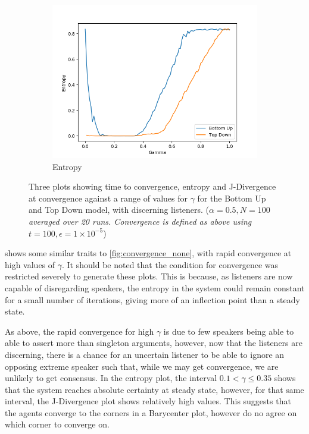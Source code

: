 \begin{figure}[H]
\begin{subfigure}[ht]{0.45\textwidth}
    \includegraphics[width=\textwidth]{Images/Figures/All/Entropy_FIE_n_3_p_100_alpha_0,3_30_runs.png}
    \caption{Entropy}
 \end{subfigure}

 \caption{Three plots showing time to convergence, entropy and J-Divergence at convergence against a range of values for $\gamma$ for the Bottom Up and Top Down model, with discerning listeners. (\textit{$\alpha = 0.5, N = 100$ averaged over 20 runs. Convergence is defined as above using $t=100, \epsilon = 1\times10^{-5}$})}\label{fig:convergence_FIE}
\end{figure}


 shows some similar traits to \cref{fig:convergence_none}, with rapid convergence at high values of $\gamma$. It should be noted that the condition for convergence was restricted severely to generate these plots. This is because, as listeners are now capable of disregarding speakers, the entropy in the system could remain constant for a small number of iterations, giving more of an inflection point than a steady state. 

As above, the rapid convergence for high $\gamma$ is due to few speakers being able to able to assert more than singleton arguments, however, now that the listeners are discerning, there is a chance for an uncertain listener to be able to ignore an opposing extreme speaker such that, while we may get convergence, we are unlikely to get consensus. In the entropy plot, the interval $0.1 < \gamma \leq 0.35 $ shows that the system reaches absolute certainty at steady state, however, for that same interval, the J-Divergence plot shows relatively high values. This suggests that the agents converge to the corners in a Barycenter plot, however do no agree on which corner to converge on. 

